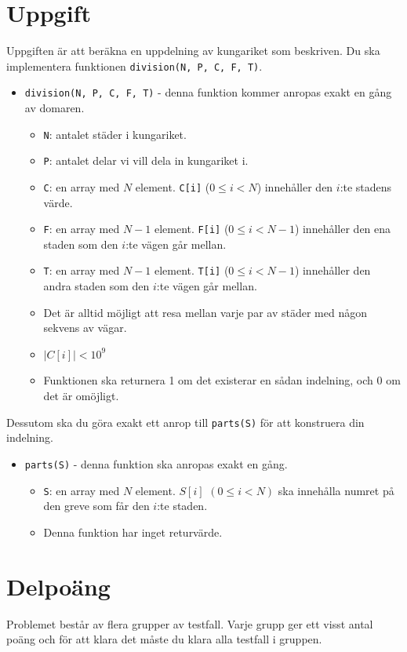 \section*{Uppgift}
Uppgiften är att beräkna en uppdelning av kungariket som beskriven. Du ska implementera funktionen
\texttt{division(N, P, C, F, T)}.

\begin{itemize}
  \item \texttt{division(N, P, C, F, T)} - denna funktion kommer anropas exakt en gång av domaren.
  \begin{itemize}
    \item \texttt{N}: antalet städer i kungariket.
    \item \texttt{P}: antalet delar vi vill dela in kungariket i.
    \item \texttt{C}: en array med $N$ element. \texttt{C[i]} ($0 \le i < N$) innehåller den $i$:te stadens värde.
    \item \texttt{F}: en array med $N - 1$ element. \texttt{F[i]} ($0 \le i < N - 1$) innehåller den ena staden som den $i$:te vägen går mellan.
    \item \texttt{T}: en array med $N - 1$ element. \texttt{T[i]} ($0 \le i < N - 1$) innehåller den andra staden som den $i$:te vägen går mellan.
    \item Det är alltid möjligt att resa mellan varje par av städer med någon sekvens av vägar.
    \item $|C[i]| < 10^9$
    \item Funktionen ska returnera 1 om det existerar en sådan indelning, och 0 om det är omöjligt.
  \end{itemize}
\end{itemize}

Dessutom ska du göra exakt ett anrop till \texttt{parts(S)} för att konstruera din indelning.
\begin{itemize}
  \item \texttt{parts(S)} - denna funktion ska anropas exakt en gång.
  \begin{itemize}
    \item \texttt{S}: en array med $N$ element. $S[i]$ $(0 \le i < N)$ ska innehålla numret på den greve som får den $i$:te staden.
    \item Denna funktion har inget returvärde.
  \end{itemize}
\end{itemize}


\section*{Delpoäng}
Problemet består av flera grupper av testfall. Varje grupp ger ett visst antal poäng och för att klara det måste du klara alla testfall i gruppen.

